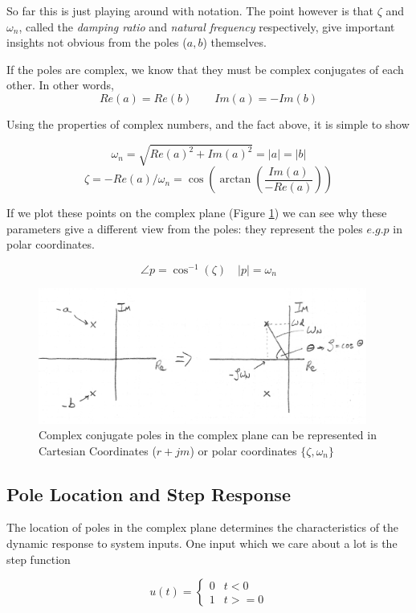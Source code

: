 So far this is just playing around with notation.  The point  however is that $\zeta$ and $\omega_n$, called the {\it damping ratio} and {\it natural frequency} respectively, give important insights not obvious from the poles ($a,b$) themselves.

If the poles are complex, we know that they must  be complex conjugates of each other. In other words,
\[
Re(a) = Re(b) \qquad Im(a) = -Im(b)
\]

Using the properties of complex numbers, and the fact above, it is simple to show

\[
\omega_n = \sqrt{Re(a)^2 + Im(a)^2} = |a| = |b|
\]
\[
\zeta = -Re(a)/\omega_n = \cos\left(\arctan\left(\frac{Im(a)}{-Re(a)}\right)\right)
\]

If we plot these points on the complex plane (Figure \ref{ccpoleszeta}) we can see why these parameters give a different view from the poles:
they represent the poles $e.g. p$ in polar coordinates.

\[ \angle p = \cos^{-1}(\zeta) \quad |p| = \omega_n
\]


\begin{figure}\centering
 \includegraphics[width=4.25in]{figs05/00733a.png}
\caption{Complex conjugate poles in the complex plane can be represented in Cartesian Coordinates ($r+jm$) or polar coordinates $\{\zeta, \omega_n\}$}\label{ccpoleszeta}
\end{figure}

\subsection{Pole Location and Step Response}

The location of poles in the complex plane determines the characteristics of the dynamic response to system inputs.  One input which we care about a lot is the step function

\[
u(t) = \left \{ \begin{array}{cc} 0 & t< 0 \\ 1 & t >= 0 \end{array} \right .
\]

